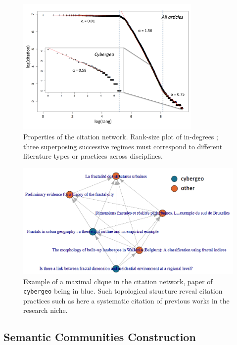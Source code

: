 \begin{figure}
\centering
\includegraphics[width=0.8\textwidth]{figures/ranksize.pdf}
\caption[Properties of the citation network]{Properties of the citation network. Rank-size plot of in-degrees ; three superposing successive regimes must correspond to different literature types or practices across disciplines.}
\label{fig:quantepistemo:citnw}
\end{figure}


\begin{figure}
\includegraphics[width=\textwidth]{figures/cybclic.png}
\caption[Example of clique in the citation network]{Example of a maximal clique in the citation network, paper of \texttt{cybergeo} being in blue. Such topological structure reveal citation practices such as here a systematic citation of previous works in the research niche.}
\label{fig:quantepistemo:cliques}
\end{figure}



\subsection{Semantic Communities Construction}



